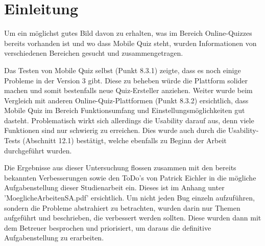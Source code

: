 





\section{Einleitung}

Um ein möglichst gutes Bild davon zu erhalten, was im Bereich Online-Quizzes bereits vorhanden ist und wo dass Mobile Quiz steht, wurden Informationen von verschiedenen Bereichen gesucht und zusammengetragen.


Das Testen von Mobile Quiz selbst (Punkt 8.3.1) zeigte, dass es noch einige Probleme in der Version 3 gibt. Diese zu beheben würde die Plattform solider machen und somit bestenfalls neue Quiz-Ersteller anziehen.
Weiter wurde beim Vergleich mit anderen Online-Quiz-Plattformen (Punkt 8.3.2) ersichtlich, dass Mobile Quiz im Bereich Funktionsumfang und Einstellungsmöglichkeiten gut dasteht. Problematisch wirkt sich allerdings die Usability darauf aus, denn viele Funktionen sind nur schwierig zu erreichen. Dies wurde auch durch die Usability-Tests (Abschnitt 12.1) bestätigt, welche ebenfalls zu Beginn der Arbeit durchgeführt wurden.

Die Ergebnisse aus dieser Untersuchung flossen zusammen mit den bereits bekannten Verbesserungen sowie den ToDo's von Patrick Eichler in die mögliche Aufgabenstellung dieser Studienarbeit ein. Dieses ist im Anhang unter 'MoeglicheArbeitenSA.pdf' ersichtlich. Um nicht jeden Bug einzeln aufzuführen, sondern die Probleme abstrahiert zu betrachten, wurden darin nur Themen aufgeführt und beschrieben, die verbessert werden sollten. Diese wurden dann mit dem Betreuer besprochen und priorisiert, um daraus die definitive Aufgabenstellung zu erarbeiten.

